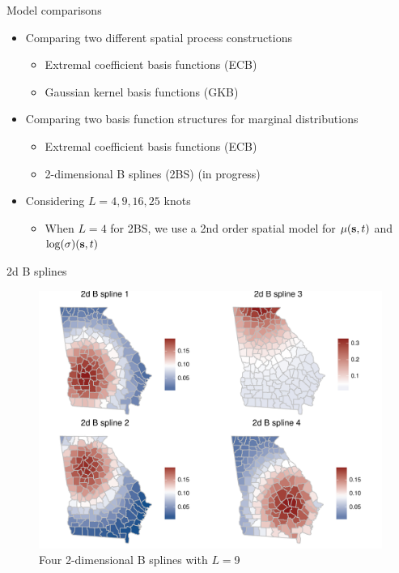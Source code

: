 \documentclass{beamer}
\begin{document}
\begin{frame}{Model comparisons}
  \begin{itemize} \setlength{\itemsep}{1em}
    \item Comparing two different spatial process constructions
    \begin{itemize} \setlength{\itemsep}{0.5em}
      \item Extremal coefficient basis functions (ECB)
      \item Gaussian kernel basis functions (GKB)
    \end{itemize}
    \item Comparing two basis function structures for marginal distributions
    \begin{itemize} \setlength{\itemsep}{0.5em}
      \item Extremal coefficient basis functions (ECB)
      \item 2-dimensional B splines (2BS) (\alert{in progress})
    \end{itemize}
    \item Considering $L = 4, 9, 16, 25$ knots
    \begin{itemize} \setlength{\itemsep}{0.5em}
      \item When $L = 4$ for 2BS, we use a 2nd order spatial model for $\mu(\mbox{\bf s}, t)$ and $\log(\sigma) (\mbox{\bf s}, t)$
    \end{itemize}
  \end{itemize}
\end{frame}

\begin{frame}{2d B splines}
  \begin{figure}
    \centering
    \includegraphics[width = 0.75\linewidth, trim = 0 2em 0 0]{plots/2d-basis.pdf}
    \caption{Four 2-dimensional B splines with $L =$9}
  \end{figure}
\end{frame}
\end{document}
